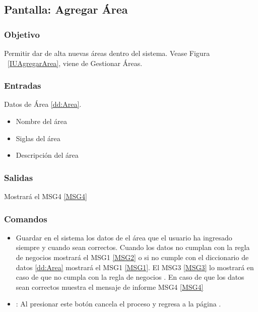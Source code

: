 \subsection{Pantalla: Agregar Área}

\subsubsection{Objetivo}
Permitir dar de alta nuevas áreas dentro del sistema.  Vease Figura ~\ref{IUAgregarArea}, viene de Gestionar Áreas.



\subsubsection{Entradas}
Datos de Área \ref{dd:Area}.
\begin{itemize}
 \item Nombre del área
 \item Siglas del área
 \item Descripción del área
\end{itemize}


\subsubsection{Salidas}
Mostrará el MSG4 \ref{MSG4}

\subsubsection{Comandos}
\begin{itemize}
 \item {} Guardar en el sistema los datos de el área que el usuario ha ingresado siempre y cuando sean correctos. Cuando los datos no cumplan con la regla de negocios   mostrará el MSG1 \ref{MSG2} o si no cumple con el diccionario de datos \ref{dd:Area} mostrará el MSG1 \ref{MSG1}.  El MSG3 \ref{MSG3} lo mostrará en caso de que no cumpla con la regla de negocios . En caso de que los datos sean correctos muestra el mensaje de informe MSG4 \ref{MSG4} 
 \item {}: Al presionar este botón cancela el proceso y regresa a la página .

\end{itemize}


